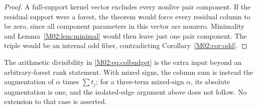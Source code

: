 \documentclass[11pt,a4paper,oneside]{report}
\theoremstyle{definition}
\theoremstyle{remark}
\begin{document}
\begin{proof}
A full-support kernel vector excludes every nonlive pair component. If the residual support were a forest, the theorem would force every residual column to be zero, since all component parameters in this vector are nonzero. Minimality and Lemma~\ref{M02:lem:minimal} would then leave just one pair component. The triple would be an internal odd fiber, contradicting Corollary~\ref{M02:cor:odd}.
\end{proof}
The arithmetic divisibility in \eqref{M02:eq:colbudget} is the extra input beyond an arbitrary-forest rank statement. With mixed signs, the column sum is instead the augmentation of \(\alpha\) times \(\sum t_j\); for a three-term mixed-sign \(\alpha\), its absolute augmentation is one, and the isolated-edge argument above does not follow. No extension to that case is asserted.
\end{document}
